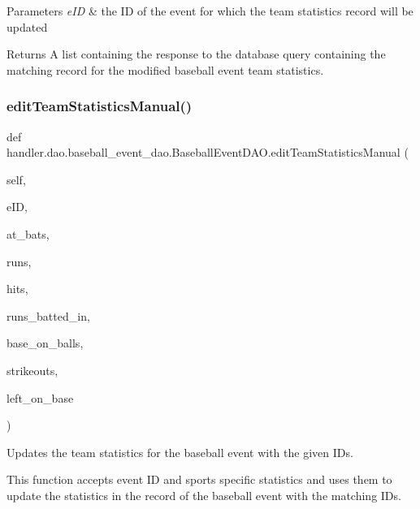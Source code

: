 \begin{DoxyParams}{Parameters}
{\em e\+ID} & the ID of the event for which the team statistics record will be updated\\
\hline
\end{DoxyParams}
\begin{DoxyReturn}{Returns}
A list containing the response to the database query containing the matching record for the modified baseball event team statistics. 
\end{DoxyReturn}
\mbox{\label{classhandler_1_1dao_1_1baseball__event__dao_1_1_baseball_event_d_a_o_a18eec407eddeab50984d53785bcbc6c1}} 
\subsubsection{\texorpdfstring{edit\+Team\+Statistics\+Manual()}{editTeamStatisticsManual()}}
{\footnotesize\ttfamily def handler.\+dao.\+baseball\+\_\+event\+\_\+dao.\+Baseball\+Event\+D\+A\+O.\+edit\+Team\+Statistics\+Manual (\begin{DoxyParamCaption}\item[{}]{self,  }\item[{}]{e\+ID,  }\item[{}]{at\+\_\+bats,  }\item[{}]{runs,  }\item[{}]{hits,  }\item[{}]{runs\+\_\+batted\+\_\+in,  }\item[{}]{base\+\_\+on\+\_\+balls,  }\item[{}]{strikeouts,  }\item[{}]{left\+\_\+on\+\_\+base }\end{DoxyParamCaption})}



Updates the team statistics for the baseball event with the given I\+Ds. 

This function accepts event ID and sports specific statistics and uses them to update the statistics in the record of the baseball event with the matching I\+Ds.


